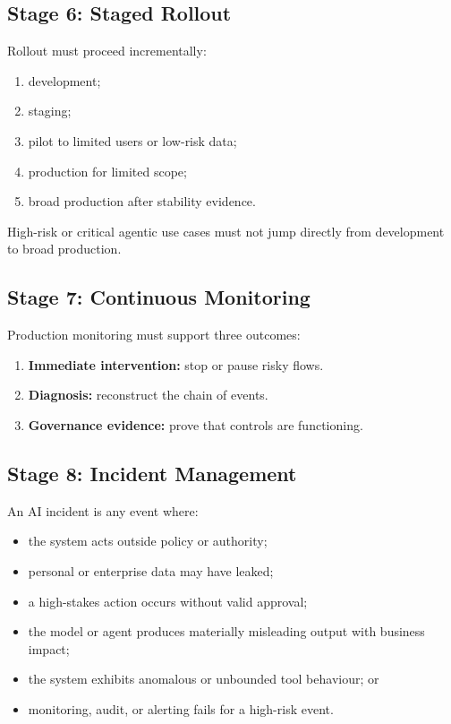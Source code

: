 \documentclass[11pt,a4paper]{article}
\begin{document}
\subsection{Stage 6: Staged Rollout}

Rollout must proceed incrementally:

\begin{enumerate}[nosep]
    \item development;
    \item staging;
    \item pilot to limited users or low-risk data;
    \item production for limited scope;
    \item broad production after stability evidence.
\end{enumerate}

High-risk or critical agentic use cases must not jump directly from development to broad production.

\subsection{Stage 7: Continuous Monitoring}

Production monitoring must support three outcomes:

\begin{enumerate}[nosep]
    \item \textbf{Immediate intervention:} stop or pause risky flows.
    \item \textbf{Diagnosis:} reconstruct the chain of events.
    \item \textbf{Governance evidence:} prove that controls are functioning.
\end{enumerate}

\subsection{Stage 8: Incident Management}

An AI incident is any event where:

\begin{itemize}[nosep]
    \item the system acts outside policy or authority;
    \item personal or enterprise data may have leaked;
    \item a high-stakes action occurs without valid approval;
    \item the model or agent produces materially misleading output with business impact;
    \item the system exhibits anomalous or unbounded tool behaviour; or
    \item monitoring, audit, or alerting fails for a high-risk event.
\end{itemize}
\end{document}
